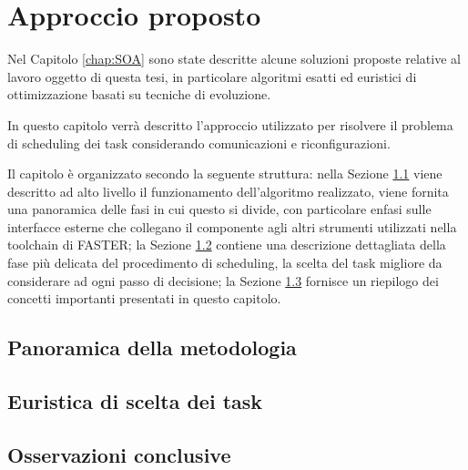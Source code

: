 \chapter{Approccio proposto}
\label{chap:approccio}
\vspace{1cm}
Nel Capitolo \ref{chap:SOA} sono state descritte alcune soluzioni proposte 
relative al lavoro oggetto di questa tesi, in particolare algoritmi esatti ed
euristici di ottimizzazione basati su tecniche di evoluzione.

In questo capitolo verrà descritto l'approccio utilizzato per risolvere il 
problema di scheduling dei task considerando comunicazioni e riconfigurazioni.

Il capitolo è organizzato secondo la seguente struttura: nella Sezione 
\ref{sec:panoramicaMetodologia} viene descritto ad alto livello il 
funzionamento dell'algoritmo realizzato, viene fornita una panoramica delle 
fasi in cui questo si divide, con particolare enfasi sulle interfacce esterne 
che collegano il componente agli altri strumenti utilizzati nella toolchain di 
\acs{FASTER}; la Sezione \ref{sec:euristicaSceltaTask} contiene una descrizione 
dettagliata della fase più delicata del procedimento di scheduling, la scelta 
del task migliore da considerare ad ogni passo di decisione; la Sezione 
\ref{sec:osservazioniConclusive} fornisce un riepilogo dei concetti importanti 
presentati in questo capitolo.


\section{Panoramica della metodologia}
\label{sec:panoramicaMetodologia}


\section{Euristica di scelta dei task}
\label{sec:euristicaSceltaTask}


\section{Osservazioni conclusive}
\label{sec:osservazioniConclusive}
